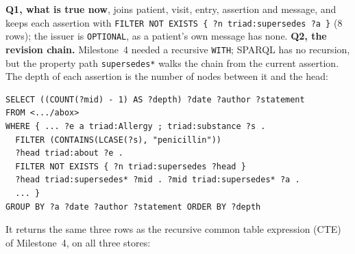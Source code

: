 \documentclass[sigconf]{acmart}
\newcommand{\tw}[1]{\texttt{#1}}
\begin{document}
\textbf{Q1, what is true now}, joins patient, visit, entry, assertion and message, and keeps each assertion with \tw{FILTER NOT EXISTS \{ ?n triad:supersedes ?a \}} (8 rows); the issuer is \tw{OPTIONAL}, as a patient's own message has none. \textbf{Q2, the revision chain.} Milestone~4 needed a recursive \tw{WITH}; SPARQL has no recursion, but the property path \tw{supersedes*} walks the chain from the current assertion. The depth of each assertion is the number of nodes between it and the head:
\par\noindent\begin{minipage}{\columnwidth}\begin{lstlisting}
SELECT ((COUNT(?mid) - 1) AS ?depth) ?date ?author ?statement
FROM <.../abox>
WHERE { ... ?e a triad:Allergy ; triad:substance ?s .
  FILTER (CONTAINS(LCASE(?s), "penicillin"))
  ?head triad:about ?e .
  FILTER NOT EXISTS { ?n triad:supersedes ?head }
  ?head triad:supersedes* ?mid . ?mid triad:supersedes* ?a .
  ... }
GROUP BY ?a ?date ?author ?statement ORDER BY ?depth
\end{lstlisting}\end{minipage}\par
\noindent It returns the same three rows as the recursive common table expression (CTE) of Milestone~4, on all three stores:
\par{}\par
\end{document}
